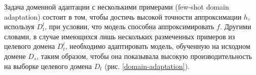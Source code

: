 Задача доменной адаптации с несколькими примерами (few-shot domain adaptation) состоит в том, чтобы достичь высокой точности аппроксимации $h$, используя $D_t^l$, при условии, что модель способна аппроксимировать $f$. Другими словами, в случае имеющихся лишь нескольких размеченных примеров из целевого домена $D_t^l$, необходимо адаптировать модель, обученную на исходном домене $D_s$, таким образом, чтобы она показывала высокую производительность на выборке целевого домена $D_t$ (рис. \ref{domain-adaptation}).

